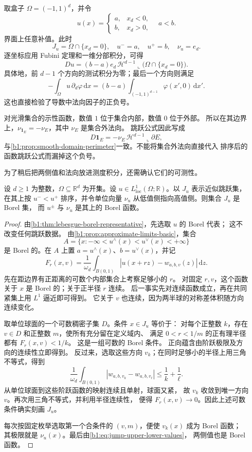 \ProseParagraphBreak

取盒子 \(\Omega=(-1,1)^d\)，并令
\[
 u(x)=
 \begin{cases}
  a,&x_d<0,\\
  b,&x_d>0,
 \end{cases}
 \quad a<b.
\]
界面上任意补值。此时
\[
 J_u=\Omega\cap\{x_d=0\},\quad
 u^-=a,\quad u^+=b,\quad \nu_u=e_d.
\]
逐坐标应用 Fubini 定理和一维分部积分，可得
\[
 Du=(b-a)e_d\,\mathcal H^{d-1}\llcorner
       \bigl(\Omega\cap\{x_d=0\}\bigr).
\]
具体地，前 \(d-1\) 个方向的测试积分为零；最后一个方向则满足
\[
 -\int_\Omega u\,\partial_d\varphi\,\mathrm dx
 =(b-a)\int_{(-1,1)^{d-1}}\varphi(x',0)\,\mathrm dx'.
\]
这也直接检验了导数中法向因子的正负号。

\ProseParagraphBreak

对光滑集合的示性函数，数值 \(1\) 位于集合内部，数值 \(0\) 位于外部。
所以在其边界上，\(\nu_{\mathbf1_E}=-\nu_E\)，其中 \(\nu_E\) 是集合外法向。
跳跃公式因此写成
\[
 D\mathbf1_E=-\nu_E\,\mathcal H^{d-1}\llcorner\partial E,
\]
与\cref{b1:prop:smooth-domain-perimeter}一致。不能将集合外法向直接代入
排序后的函数跳跃公式而漏掉这个负号。

\ProseParagraphBreak

为了稍后把两侧值和法向放进测度积分，还需确认它们的可测性。
\begin{proposition}\label{b1:prop:jump-data-borel}
设 \(d\ge1\) 为整数，\(\Omega\subseteq\mathbb R^d\) 为开集。设 \(u\in L^1_{\mathrm{loc}}(\Omega;\mathbb R)\)。以 \(J_u\) 表示近似跳跃集，在其上按 \(u^-<u^+\) 排序，并令单位向量 \(\nu_u\) 从低值侧指向高值侧。则集合 \(J_u\) 是 Borel 集，
而 \(u^\pm\) 与 \(\nu_u\) 是其上的 Borel 函数。
\end{proposition}
\begin{proof}
由\cref{b1:thm:lebesgue-borel-representative}，先选取 \(u\) 的 Borel 代表；
这不改变任何跳跃数据。
由\cref{b1:prop:approximate-limits-basic}，集合
\[
 A=\{x:-\infty<u^\wedge(x)<u^\vee(x)<+\infty\}
\]
是 Borel 的。在 \(A\) 上置 \(a=u^\wedge(x)\)、\(b=u^\vee(x)\)，并记
\[
 F_r(x,v)=\frac1{\omega_d}\int_{B(0,1)}
       |u(x+rz)-w_{a,b,v}(z)|\,\mathrm dz.
\]
先在距边界有正距离的可数个内部集合上考察足够小的 \(r\)。
对固定 \(r,v\)，这个函数关于 \(x\) 是 Borel 的；关于正半径 \(r\) 连续。
后一事实先对连续函数成立，再在共同紧集上用 \(L^1\) 逼近即可得到。
它关于 \(v\) 也连续，因为两半球的对称差体积随方向连续变化。

取单位球面的一个可数稠密子集 \(D\)。条件 \(x\in J_u\) 等价于：
对每个正整数 \(k\)，存在 \(v\in D\) 和正整数 \(m\)，使所有充分留在定义域内、
满足 \(0<r<1/m\) 的正有理半径都有 \(F_r(x,v)<1/k\)。
这是一组可数的 Borel 条件。
正向蕴含由阶跃极限及方向的连续性立即得到。
反过来，选取这些方向 \(v_k\)；在同时足够小的半径上用三角不等式，得到
\[
 \frac1{\omega_d}\int_{B(0,1)}
 |w_{a,b,v_k}-w_{a,b,v_\ell}|
 \le \frac1k+\frac1\ell.
\]
从单位球面到这些阶跃函数的映射连续且单射，球面又紧，
故 \(v_k\) 收敛到唯一方向 \(v\)。再次用三角不等式，并利用半径连续性，
便得 \(F_r(x,v)\to0\)。因此上述可数条件确实刻画 \(J_u\)。

每次按固定枚举选取第一个合条件的 \((v,m)\)，便使 \(v_k(x)\) 成为 Borel 函数；
其极限就是 \(\nu_u(x)\)。最后由\eqref{b1:eq:jump-upper-lower-values}，
两侧值也是 Borel 函数。
\end{proof}

